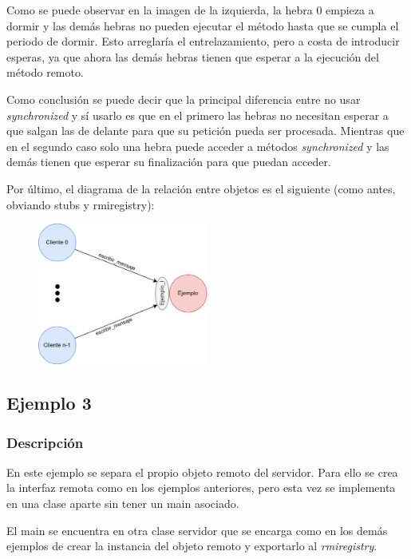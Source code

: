 \documentclass{article}
\begin{document}
Como se puede observar en la imagen de la izquierda, la hebra 0 empieza a dormir y las demás hebras no pueden ejecutar el método hasta que se cumpla el periodo de dormir. Esto arreglaría el entrelazamiento, pero a costa de introducir esperas, ya que ahora las demás hebras tienen que esperar a la ejecución del método remoto.

\bigskip

Como conclusión se puede decir que la principal diferencia entre no usar \textit{synchronized} y sí usarlo es que en el primero las hebras no necesitan esperar a que salgan las de delante para que su petición pueda ser procesada. Mientras que en el segundo caso solo una hebra puede acceder a métodos \textit{synchronized} y las demás tienen que esperar su finalización para que puedan acceder.

\bigskip

Por último, el diagrama de la relación entre objetos es el siguiente (como antes, obviando stubs y rmiregistry):

\begin{figure}[H]
    \centering
    \includegraphics[width=0.5\textwidth]{imagenes/E2Diagrama.png}
\end{figure}

\newpage

\subsection{Ejemplo 3}
\subsubsection{Descripción}
En este ejemplo se separa el propio objeto remoto del servidor. Para ello se crea la interfaz remota como en los ejemplos anteriores, pero esta vez se implementa en una clase aparte sin tener un main asociado.

El main se encuentra en otra clase servidor que se encarga como en los demás ejemplos de crear la instancia del objeto remoto y exportarlo al \textit{rmiregistry}.
\end{document}
